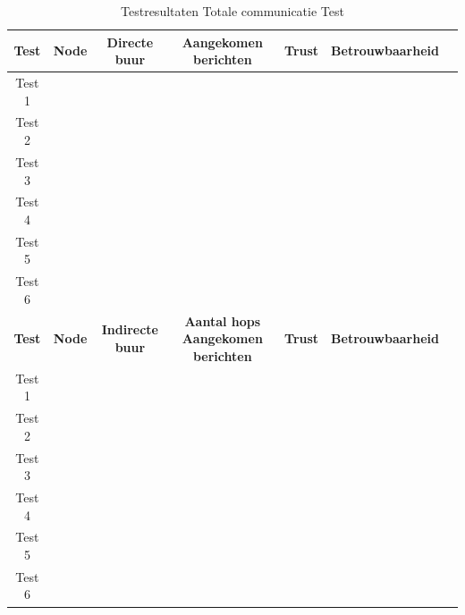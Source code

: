 \begin{table}[h]
    \centering
    \begin{tabular}{|c||c|c|c|c|c|c|}
        \hline
        \textbf{Test}    & \textbf{Node}  & \textbf{Directe buur}   & \textbf{Aangekomen berichten}  & \textbf{Trust}     & \textbf{Betrouwbaarheid}   &\\\hline\hline
        Test 1  &       &                &                       &           &                   &\\\hline
        Test 2  &       &                &                       &           &                   &\\\hline
        Test 3  &       &                &                       &           &                   &\\\hline
        Test 4  &       &                &                       &           &                   &\\\hline
        Test 5  &       &                &                       &           &                   &\\\hline
        Test 6  &       &                &                       &           &                   &\\\hline\hline
        \textbf{Test}    & \textbf{Node}  & \textbf{Indirecte buur}   & \textbf{Aantal hops} \textbf{Aangekomen berichten}  & \textbf{Trust}     & \textbf{Betrouwbaarheid}   \\\hline\hline
        Test 1  &       &                &           &            &           &                   \\\hline
        Test 2  &       &                &           &            &           &                   \\\hline
        Test 3  &       &                &           &            &           &                   \\\hline
        Test 4  &       &                &           &            &           &                   \\\hline
        Test 5  &       &                &           &            &           &                   \\\hline
        Test 6  &       &                &           &            &           &                   \\\hline\hline
    \end{tabular}
    \caption{Testresultaten Totale communicatie Test}
    \label{Test:TotCom}
\end{table}

